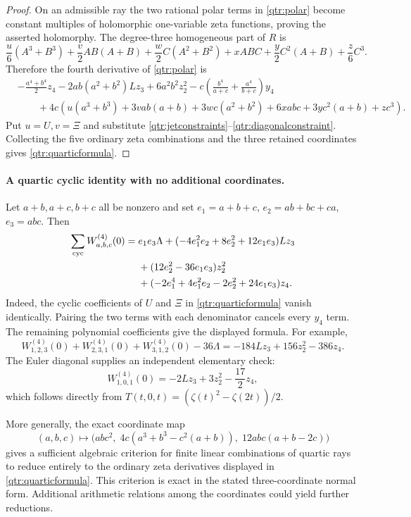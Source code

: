 \documentclass[11pt,a4paper]{article}
\numberwithin{equation}{section}
\theoremstyle{definition}
\theoremstyle{remark}
\begin{document}
\begin{proof}
On an admissible ray the two rational polar terms in
\eqref{qtr:polar} become constant multiples of holomorphic
one-variable zeta functions, proving the asserted holomorphy.
The degree-three homogeneous part of \(R\) is
\[
 \frac{u}{6}(A^3+B^3)+\frac{v}{2}AB(A+B)
 +\frac{w}{2}C(A^2+B^2)+xABC
 +\frac{y}{2}C^2(A+B)+\frac{z}{6}C^3.
\]
Therefore the fourth derivative of \eqref{qtr:polar} is
\begin{align*}
 &-\frac{a^4+b^4}{2}z_4
 -2ab(a^2+b^2)Lz_3+6a^2b^2z_2^2
 -c\left(\frac{b^4}{a+c}+\frac{a^4}{b+c}\right)y_4\\
 &\qquad+4c\left(u(a^3+b^3)+3vab(a+b)
 +3wc(a^2+b^2)+6xabc+3yc^2(a+b)+zc^3\right).
\end{align*}
Put \(u=U,v=\Xi\) and substitute
\eqref{qtr:jetconstraints}--\eqref{qtr:diagonalconstraint}.
Collecting the five ordinary zeta combinations and the three
retained coordinates gives \eqref{qtr:quarticformula}.
\end{proof}

\paragraph{A quartic cyclic identity with no additional coordinates.}
Let \(a+b,a+c,b+c\) all be nonzero and set
\(e_1=a+b+c\), \(e_2=ab+bc+ca\), \(e_3=abc\).
Then
\begin{align}
 \sum_{\mathrm{cyc}}W_{a,b,c}^{(4)}(0)
 ={}&e_1e_3\Lambda
 +(-4e_1^2e_2+8e_2^2+12e_1e_3)Lz_3\notag\\
 &+(12e_2^2-36e_1e_3)z_2^2\notag\\
 &+(-2e_1^4+4e_1^2e_2-2e_2^2+24e_1e_3)z_4.
 \label{qtr:cyclicquartic}
\end{align}
Indeed, the cyclic coefficients of \(U\) and \(\Xi\) in
\eqref{qtr:quarticformula} vanish identically. Pairing the two
terms with each denominator cancels every \(y_4\) term.
The remaining polynomial coefficients give the displayed formula.
For example,
\begin{equation}\label{qtr:example}
 W_{1,2,3}^{(4)}(0)+W_{2,3,1}^{(4)}(0)
 +W_{3,1,2}^{(4)}(0)-36\Lambda
 =-184Lz_3+156z_2^2-386z_4.
\end{equation}
The Euler diagonal supplies an independent elementary check:
\[
 W_{1,0,1}^{(4)}(0)
 =-2Lz_3+3z_2^2-\frac{17}{2}z_4,
\]
which follows directly from
\(T(t,0,t)=(\zeta(t)^2-\zeta(2t))/2\).

More generally, the exact coordinate map
\[
 (a,b,c)\longmapsto
 \bigl(abc^2,\;
 4c(a^3+b^3-c^2(a+b)),\;
 12abc(a+b-2c)\bigr)
\]
gives a sufficient algebraic criterion for finite linear
combinations of quartic rays to reduce entirely to the ordinary
zeta derivatives displayed in \eqref{qtr:quarticformula}.
This criterion is exact in the stated three-coordinate normal
form. Additional arithmetic relations among the coordinates
could yield further reductions.
\end{document}
